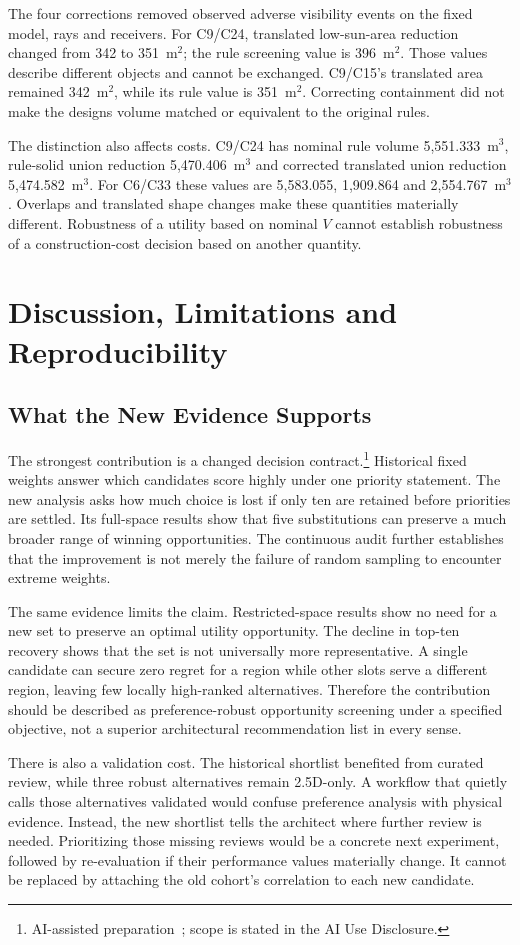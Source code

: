 \documentclass{llncs}
\newcommand{\aidraft}{\footnote{AI-assisted preparation~\cite{openai2026}; scope is stated in the AI Use Disclosure.}}
\begin{document}
The four corrections removed observed adverse visibility events on the fixed model, rays and receivers. For C9/C24, translated low-sun-area reduction changed from 342 to 351~m$^2$; the rule screening value is 396~m$^2$. Those values describe different objects and cannot be exchanged. C9/C15's translated area remained 342~m$^2$, while its rule value is 351~m$^2$. Correcting containment did not make the designs volume matched or equivalent to the original rules.

The distinction also affects costs. C9/C24 has nominal rule volume 5,551.333~m$^3$, rule-solid union reduction 5,470.406~m$^3$ and corrected translated union reduction 5,474.582~m$^3$. For C6/C33 these values are 5,583.055, 1,909.864 and 2,554.767~m$^3$. Overlaps and translated shape changes make these quantities materially different. Robustness of a utility based on nominal $V$ cannot establish robustness of a construction-cost decision based on another quantity.

\section{Discussion, Limitations and Reproducibility}
\subsection{What the New Evidence Supports}
The strongest contribution is a changed decision contract.\aidraft{} Historical fixed weights answer which candidates score highly under one priority statement. The new analysis asks how much choice is lost if only ten are retained before priorities are settled. Its full-space results show that five substitutions can preserve a much broader range of winning opportunities. The continuous audit further establishes that the improvement is not merely the failure of random sampling to encounter extreme weights.

The same evidence limits the claim. Restricted-space results show no need for a new set to preserve an optimal utility opportunity. The decline in top-ten recovery shows that the set is not universally more representative. A single candidate can secure zero regret for a region while other slots serve a different region, leaving few locally high-ranked alternatives. Therefore the contribution should be described as preference-robust opportunity screening under a specified objective, not a superior architectural recommendation list in every sense.

There is also a validation cost. The historical shortlist benefited from curated review, while three robust alternatives remain 2.5D-only. A workflow that quietly calls those alternatives validated would confuse preference analysis with physical evidence. Instead, the new shortlist tells the architect where further review is needed. Prioritizing those missing reviews would be a concrete next experiment, followed by re-evaluation if their performance values materially change. It cannot be replaced by attaching the old cohort's correlation to each new candidate.
\end{document}
